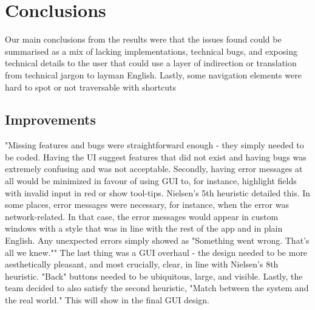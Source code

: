 \section{Conclusions}


Our main conclusions from the results were that the issues found could be summarised as a mix of lacking implementations, technical bugs, and exposing technical details to the user that could use a layer of indirection or translation from technical jargon to layman English. Lastly, some navigation elements were hard to spot or not traversable with shortcuts

\subsection{Improvements}

"Missing features and bugs were straightforward enough - they simply needed to be coded. Having the UI suggest features that did not exist and having bugs was extremely confusing and was not acceptable. Secondly, having error messages at all would be minimized in favour of using GUI to, for instance, highlight fields with invalid input in red or show tool-tips. Nielsen's 5th heuristic detailed this. In some places, error messages were necessary, for instance, when the error was network-related. In that case, the error messages would appear in custom windows with a style that was in line with the rest of the app and in plain English. Any unexpected errors simply showed as "Something went wrong. That’s all we knew.""
The last thing was a GUI overhaul - the design needed to be more aesthetically pleasant, and most crucially, clear, in line with Nielsen’s 8th heuristic. "Back" buttons needed to be ubiquitous, large, and visible. Lastly, the team decided to also satisfy the second heuristic, "Match between the system and the real world." This will show in the final GUI design.


